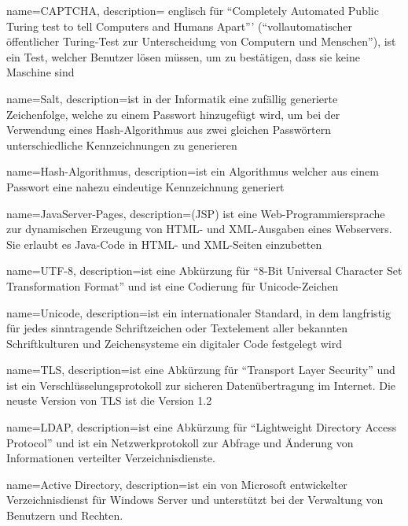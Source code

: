{
	name=CAPTCHA,
	description={
		englisch für "`Completely Automated Public Turing test to tell Computers and Humans Apart"'' ("`vollautomatischer öffentlicher Turing-Test zur Unterscheidung von Computern und Menschen"'), ist ein Test, welcher Benutzer lösen müssen, um zu bestätigen, dass sie keine Maschine sind
	}
}



{
	name=Salt,
	description={ist in der Informatik eine zufällig generierte Zeichenfolge, welche zu einem Passwort  hinzugefügt wird, um bei der Verwendung eines Hash-Algorithmus aus zwei gleichen Passwörtern unterschiedliche Kennzeichnungen zu generieren}
}

{
	name={Hash-Algorithmus},
	description={ist ein Algorithmus welcher aus einem Passwort eine nahezu eindeutige Kennzeichnung generiert}
}

{
	name={JavaServer-Pages},
	description={(JSP) ist eine Web-Programmiersprache zur dynamischen Erzeugung von HTML- und XML-Ausgaben eines Webservers. Sie erlaubt es Java-Code in HTML- und XML-Seiten einzubetten}
}

{
	name={UTF-8},
	description={ist eine Abkürzung für "`8-Bit Universal Character Set Transformation Format"' und ist eine Codierung für \gls{Unicode}-Zeichen}
}

{
	name={Unicode},
	description={ist ein internationaler Standard, in dem langfristig für jedes sinntragende Schriftzeichen oder Textelement aller bekannten Schriftkulturen und Zeichensysteme ein digitaler Code festgelegt wird}
}

{
	name={TLS},
	description={ist eine Abkürzung für "`Transport Layer Security"' und ist ein Verschlüsselungsprotokoll zur sicheren Datenübertragung im Internet. Die neuste Version von \gls{TLS} ist die Version 1.2}
}

{
	name={LDAP},
	description={ist eine Abkürzung für "`Lightweight Directory Access Protocol"' und  ist ein Netzwerkprotokoll zur Abfrage und Änderung von Informationen verteilter Verzeichnisdienste.}
}

{
	name={Active Directory},
	description={ist ein von Microsoft entwickelter Verzeichnisdienst für Windows Server und unterstützt bei der Verwaltung von Benutzern und Rechten.}
}